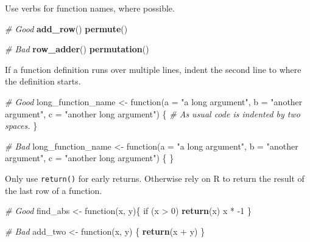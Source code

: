 \documentclass[]{book}
\newenvironment{Shaded}{\begin{snugshade}}{\end{snugshade}}
\newcommand{\KeywordTok}[1]{\textcolor[rgb]{0.13,0.29,0.53}{\textbf{{#1}}}}
\newcommand{\DataTypeTok}[1]{\textcolor[rgb]{0.13,0.29,0.53}{{#1}}}
\newcommand{\DecValTok}[1]{\textcolor[rgb]{0.00,0.00,0.81}{{#1}}}
\newcommand{\StringTok}[1]{\textcolor[rgb]{0.31,0.60,0.02}{{#1}}}
\newcommand{\CommentTok}[1]{\textcolor[rgb]{0.56,0.35,0.01}{\textit{{#1}}}}
\newcommand{\NormalTok}[1]{{#1}}
\begin{document}
Use verbs for function names, where possible.

\begin{Shaded}
\begin{Highlighting}[]
\CommentTok{# Good}
\KeywordTok{add_row}\NormalTok{()}
\KeywordTok{permute}\NormalTok{()}

\CommentTok{# Bad}
\KeywordTok{row_adder}\NormalTok{()}
\KeywordTok{permutation}\NormalTok{()}
\end{Highlighting}
\end{Shaded}

If a function definition runs over multiple lines, indent the second
line to where the definition starts.

\begin{Shaded}
\begin{Highlighting}[]
\CommentTok{# Good}
\NormalTok{long_function_name <-}\StringTok{ }\NormalTok{function(}\DataTypeTok{a =} \StringTok{"a long argument"}\NormalTok{, }
                               \DataTypeTok{b =} \StringTok{"another argument"}\NormalTok{,}
                               \DataTypeTok{c =} \StringTok{"another long argument"}\NormalTok{) \{}
  \CommentTok{# As usual code is indented by two spaces.}
\NormalTok{\}}

\CommentTok{# Bad}
\NormalTok{long_function_name <-}\StringTok{ }\NormalTok{function(}\DataTypeTok{a =} \StringTok{"a long argument"}\NormalTok{,}
  \DataTypeTok{b =} \StringTok{"another argument"}\NormalTok{,}
  \DataTypeTok{c =} \StringTok{"another long argument"}\NormalTok{) \{}
\NormalTok{\}}
\end{Highlighting}
\end{Shaded}

Only use \texttt{return()} for early returns. Otherwise rely on R to
return the result of the last row of a function.

\begin{Shaded}
\begin{Highlighting}[]
\CommentTok{# Good}
\NormalTok{find_abs <-}\StringTok{ }\NormalTok{function(x, y)\{}
  \NormalTok{if (x >}\StringTok{ }\DecValTok{0}\NormalTok{) }\KeywordTok{return}\NormalTok{(x)}
  \NormalTok{x *}\StringTok{ }\NormalTok{-}\DecValTok{1}
\NormalTok{\}}

\CommentTok{# Bad}
\NormalTok{add_two <-}\StringTok{ }\NormalTok{function(x, y) \{}
  \KeywordTok{return}\NormalTok{(x +}\StringTok{ }\NormalTok{y)}
\NormalTok{\}}
\end{Highlighting}
\end{Shaded}
\end{document}
